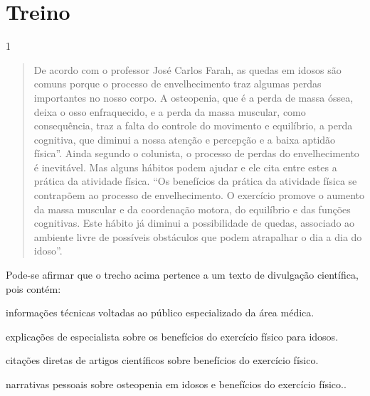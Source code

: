 \pagebreak

\section{Treino}

\num{1}

\begin{quote}

De acordo com o professor José Carlos Farah, as quedas em idosos são comuns 
porque o processo de envelhecimento traz algumas perdas importantes no nosso corpo.
A osteopenia, que é a perda de massa óssea, deixa o osso enfraquecido,
e a perda da massa muscular, como consequência, traz a falta do controle
do movimento e equilíbrio, a perda cognitiva, que diminui a nossa
atenção e percepção e a baixa aptidão física''. Ainda segundo o
colunista, o processo de perdas do envelhecimento é inevitável. Mas
alguns hábitos podem ajudar e ele cita entre estes a prática da
atividade física. ``Os benefícios da prática da atividade física se
contrapõem ao processo de envelhecimento. O exercício promove o aumento
da massa muscular e da coordenação motora, do equilíbrio e das funções
cognitivas. Este hábito já diminui a possibilidade de quedas, associado
ao ambiente livre de possíveis obstáculos que podem atrapalhar o dia a
dia do idoso''. 

\end{quote}


Pode-se afirmar que o trecho acima pertence a um texto de divulgação científica, pois contém:

\begin{escolha}
  
  \item informações técnicas voltadas ao público especializado da área médica.
  
  \item explicações de especialista sobre os benefícios do exercício físico para idosos.
  
  \item citações diretas de artigos científicos sobre benefícios do exercício físico.
  
  \item narrativas pessoais sobre osteopenia em idosos e benefícios do exercício físico..

\end{escolha}

